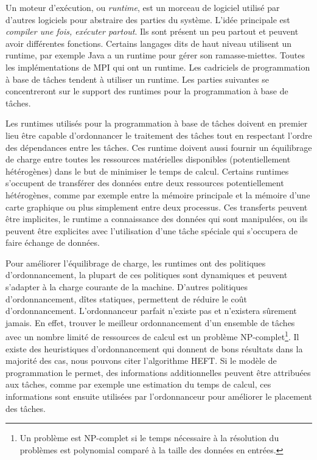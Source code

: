 Un moteur d'exécution, ou {\em runtime}, est un morceau de logiciel utilisé par d'autres logiciels pour abstraire des parties du système.
%
L'idée principale est {\em compiler une fois, exécuter partout}.
%
Ils sont présent un peu partout et peuvent avoir différentes fonctions.
%
Certains langages dits de haut niveau utilisent un runtime, par exemple Java a un runtime pour gérer son ramasse-miettes.
%
Toutes les implémentations de MPI qui ont un runtime.
%
Les cadriciels de programmation à base de tâches tendent à utiliser un runtime.
%
Les parties suivantes se concentreront sur le support des runtimes pour la programmation à base de tâches.


Les runtimes utilisés pour la programmation à base de tâches doivent en premier lieu être capable d'ordonnancer le traitement des tâches tout en respectant l'ordre des dépendances entre les tâches.
%
Ces runtime doivent aussi fournir un équilibrage de charge entre toutes les ressources matérielles disponibles (potentiellement hétérogènes) dans le but de minimiser le temps de calcul.
%
Certains runtimes s'occupent de transférer des données entre deux ressources potentiellement hétérogènes, comme par exemple entre la mémoire principale et la mémoire d'une carte graphique ou plus simplement entre deux processus.
%
Ces transferts peuvent être implicites, le runtime a connaissance des données qui sont manipulées, ou ils peuvent être explicites avec l'utilisation d'une tâche spéciale qui s'occupera de faire échange de données.


Pour améliorer l'équilibrage de charge, les runtimes ont des politiques d'ordonnancement, la plupart de ces politiques sont dynamiques et peuvent s'adapter à la charge courante de la machine.
%
D'autres politiques d'ordonnancement, dîtes statiques, permettent de réduire le coût d'ordonnancement.
%
L'ordonnanceur parfait n'existe pas et n'existera sûrement jamais.
%
En effet, trouver le meilleur ordonnancement d'un ensemble de tâches avec un nombre limité de ressources de calcul est un problème NP-complet\footnote{Un problème est NP-complet si le temps nécessaire à la résolution du problèmes est polynomial comparé à la taille des données en entrées.}.
%
Il existe des heuristiques d'ordonnancement qui donnent de bons résultats dans la majorité des cas, nous pouvons citer l'algorithme HEFT\cite{heft}.
%
Si le modèle de programmation le permet, des informations additionnelles peuvent être attribuées aux tâches, comme par exemple une estimation du temps de calcul, ces informations sont ensuite utilisées par l'ordonnanceur pour améliorer le placement des tâches.


